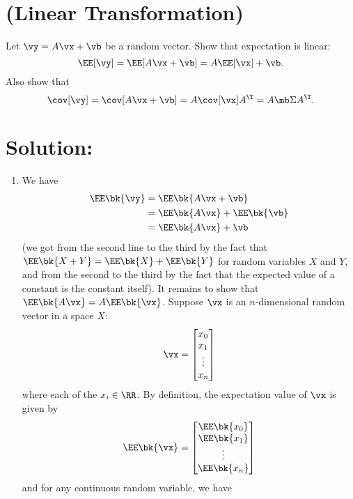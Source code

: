\documentclass[189]{pset}
\begin{document}

  \section{(Linear Transformation)}
    Let $\vy = A \vx + \vb$ be a random vector. Show that
    expectation is linear:
    \[
      \EE[\vy] = \EE[A\vx + \vb] = A\EE[\vx] + \vb.
    \]
    Also show that
    \[
      \cov[\vy] = \cov[A\vx + \vb] = A \cov[\vx] A^\T = A\mb\Sigma A^\T.
    \]

  \hrulefill

  \section*{Solution:}
    \begin{enumerate}
      \item We have
        \begin{align*}
          \EE\bk{\vy}
          &= \EE\bk{A\vx + \vb} \\
          &= \EE\bk{A\vx} + \EE\bk{\vb} \\
          &= \EE\bk{A\vx} + \vb
        \end{align*}
        (we got from the second line to the third by the fact that
        $\EE\bk{X + Y} = \EE\bk{X} + \EE\bk{Y}$ for random variables
        $X$ and $Y$, and from the second to the third by the fact that
        the expected value of a constant is the constant itself). It
        remains to show that $\EE\bk{A\vx} = A\EE\bk{\vx}$. Suppose
        $\vx$ is an $n$-dimensional random vector in a space $X$:
        \[
          \vx =
          \begin{bmatrix}
            x_0 \\
            x_1 \\
            \vdots \\
            x_n
          \end{bmatrix}
        \]
        where each of the $x_i \in \RR$. By definition, the
        expectation value of $\vx$ is given by
        \[
          \EE\bk{\vx} =
          \begin{bmatrix}
            \EE\bk{x_0} \\
            \EE\bk{x_1} \\
            \vdots \\
            \EE\bk{x_n}
          \end{bmatrix}
        \]
        and for any continuous random variable, we have

\end{enumerate}
\end{document}
